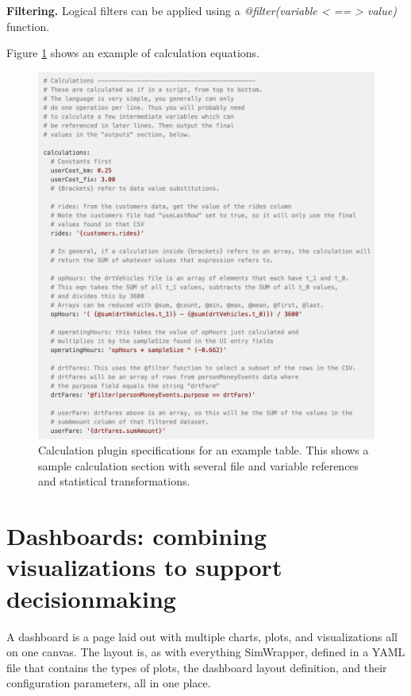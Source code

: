 \textbf{Filtering.} Logical filters can be applied using a \emph{@filter(variable < == > value)} function.

Figure \ref{fig:simwrapper-calculation-table} shows an example of calculation equations.

\begin{figure}[ht]
  \centering
  \includegraphics[width=0.7\linewidth]{chapters/31-simwrapper/images/calculation-table.png}
  \caption{Calculation plugin specifications for an example table. This shows a sample calculation section with several file and variable references and statistical transformations.}
  \label{fig:simwrapper-calculation-table}
\end{figure}



\hypertarget{simwrapper-dashboards}{%
\section{Dashboards: combining visualizations to support decisionmaking}\label{simwrapper-dashboards}}

A dashboard is a page laid out with multiple charts, plots, and visualizations all on one canvas. The layout is, as with everything SimWrapper, defined in a YAML file that contains the types of plots, the dashboard layout definition, and their configuration parameters, all in one place.

